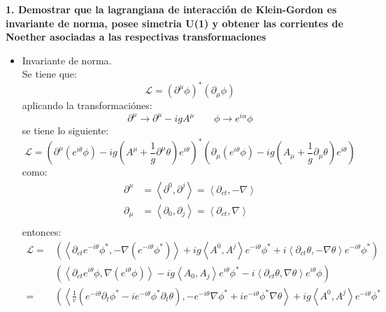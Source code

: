\textbf{1. Demostrar que la lagrangiana de interacción de Klein-Gordon es invariante de norma, posee simetria U(1) y obtener
las corrientes de Noether asociadas a las respectivas transformaciones}
\begin{itemize}
    \item Invariante de norma.\\
    Se tiene que:
    \begin{equation*}
        \mathcal{L}= \left(\partial^\mu \phi \right)^* \left(\partial_\mu \phi\right)
    \end{equation*}
    aplicando la transformaciónes:
    \begin{equation*}
        \partial^\mu \rightarrow \partial^\mu-igA^\mu \qquad \phi \rightarrow e^{i\alpha}\phi
    \end{equation*}
    se tiene lo siguiente:
    \begin{equation*}
        \mathcal{L}= \left(\partial^\mu(e^{i\theta}\phi)-ig\left(A^\mu +\frac{1}{g} \partial^\mu \theta \right)e^{i\theta} \right)^*
        \left(\partial_\mu(e^{i\theta}\phi)-ig\left(A_\mu +\frac{1}{g} \partial_\mu \theta \right)e^{i\theta} \right)
    \end{equation*}
    como:
    \begin{align*}
        \partial^\mu &= \left\langle\partial^0,\partial^j \right\rangle = \left\langle\partial_{ct},-\nabla \right\rangle\\
        \partial_\mu &= \left\langle\partial_0,\partial_j \right\rangle = \left\langle\partial_{ct},\nabla \right\rangle\\
    \end{align*}
    entonces:
    \begin{align*}
        \mathcal{L}=&\left(\left\langle \partial_{ct}e^{-i\theta}\phi^* , -\nabla(e^{-i\theta}\phi^*) \right\rangle +ig \left\langle A^0,A^j \right\rangle e^{-i\theta} \phi^* +i \left\langle \partial_{ct}\theta ,-\nabla \theta  \right\rangle e^{-i\theta}\phi^*\right)\\
        &\left(\left\langle \partial_{ct}e^{i\theta}\phi , \nabla(e^{i\theta}\phi) \right\rangle -ig \left\langle A_0,A_j \right\rangle e^{i\theta} \phi^* -i \left\langle \partial_{ct}\theta ,\nabla \theta  \right\rangle e^{i\theta}\phi\right)\\
        =&\left(\left\langle \frac{1}{c}(e^{-i\theta}\partial_{t}\phi^*-ie^{-i\theta}\phi^*\partial_{t}\theta ), -e^{-i\theta}\nabla\phi^*+ie^{-i\theta}\phi^*\nabla\theta \right\rangle +ig \left\langle A^0,A^j \right\rangle e^{-i\theta} \phi^* \right.\\

\end{align*}
\end{itemize}
